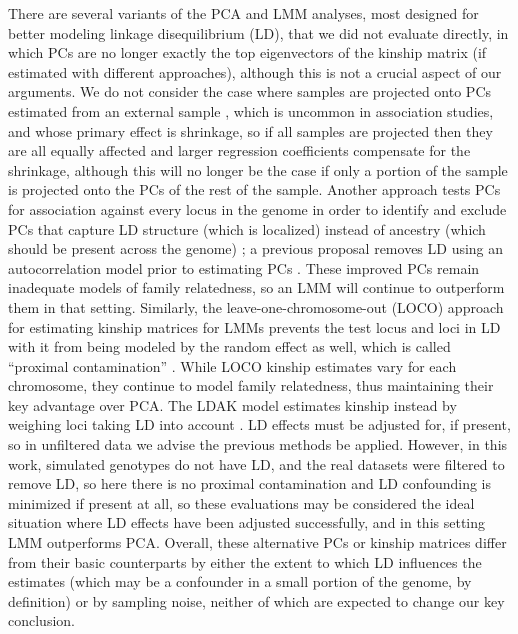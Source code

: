 \documentclass[11pt]{article}
\begin{document}
\begin{linenumbers}
There are several variants of the PCA and LMM analyses, most designed for better modeling linkage disequilibrium (LD), that we did not evaluate directly, in which PCs are no longer exactly the top eigenvectors of the kinship matrix (if estimated with different approaches), although this is not a crucial aspect of our arguments.
We do not consider the case where samples are projected onto PCs estimated from an external sample \citep{prive_efficient_2020}, which is uncommon in association studies, and whose primary effect is shrinkage, so if all samples are projected then they are all equally affected and larger regression coefficients compensate for the shrinkage, although this will no longer be the case if only a portion of the sample is projected onto the PCs of the rest of the sample.
Another approach tests PCs for association against every locus in the genome in order to identify and exclude PCs that capture LD structure (which is localized) instead of ancestry (which should be present across the genome) \citep{prive_efficient_2020}; a previous proposal removes LD using an autocorrelation model prior to estimating PCs \citep{patterson_population_2006}.
These improved PCs remain inadequate models of family relatedness, so an LMM will continue to outperform them in that setting.
Similarly, the leave-one-chromosome-out (LOCO) approach for estimating kinship matrices for LMMs prevents the test locus and loci in LD with it from being modeled by the random effect as well, which is called ``proximal contamination'' \citep{lippert_fast_2011, yang_advantages_2014}.
While LOCO kinship estimates vary for each chromosome, they continue to model family relatedness, thus maintaining their key advantage over PCA.
The LDAK model estimates kinship instead by weighing loci taking LD into account \citep{speed_improved_2012}.
LD effects must be adjusted for, if present, so in unfiltered data we advise the previous methods be applied.
However, in this work, simulated genotypes do not have LD, and the real datasets were filtered to remove LD, so here there is no proximal contamination and LD confounding is minimized if present at all, so these evaluations may be considered the ideal situation where LD effects have been adjusted successfully, and in this setting LMM outperforms PCA.
Overall, these alternative PCs or kinship matrices differ from their basic counterparts by either the extent to which LD influences the estimates (which may be a confounder in a small portion of the genome, by definition) or by sampling noise, neither of which are expected to change our key conclusion.


\end{linenumbers}
\end{document}

